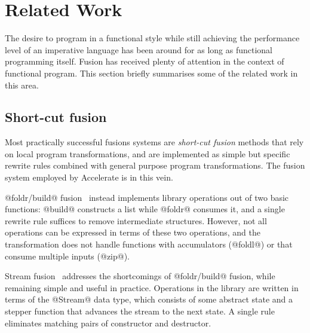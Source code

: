 %


\section{Related Work}
\label{sec:fusion_related_work}

The desire to program in a functional style while still achieving the
performance level of an imperative language has been around for as long as
functional programming itself. Fusion has received plenty of attention in the
context of functional program. This section briefly summarises some of the
related work in this area.


\subsection{Short-cut fusion}

Most practically successful fusions systems are \emph{short-cut fusion}
 methods that rely on local program transformations, and
are implemented as simple but specific rewrite rules combined with general
purpose program transformations. The fusion system employed by Accelerate is in
this vein.


@foldr/build@ fusion~\cite{Gill:1996tf,Gill:1993de}
instead implements library operations out of two basic functions: @build@
constructs a list while @foldr@ consumes it, and a single rewrite rule suffices
to remove intermediate structures. However, not all operations can be expressed
in terms of these two operations, and the transformation does not handle
functions with accumulators (@foldl@) or that consume multiple inputs (@zip@).

Stream fusion~\cite{Coutts:2007kp} addresses the
shortcomings of @foldr/build@ fusion, while remaining simple and useful in
practice. Operations in the library are written in terms of the @Stream@ data
type, which consists of some abstract state and a stepper function that advances
the stream to the next state. A single rule eliminates matching pairs of
constructor and destructor.


